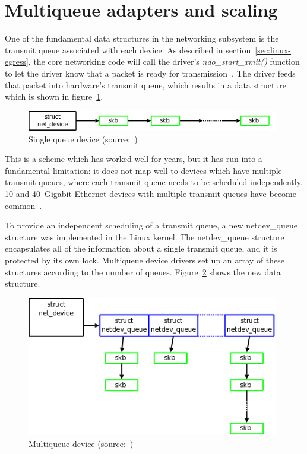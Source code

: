 
\section{Multiqueue adapters and scaling}\label{sec:linux-scaling}
One of the fundamental data structures in the networking subsystem is the transmit queue associated with each device.
As described in section~\ref{sec:linux-egress}, the core networking code will call the driver's {\it{ndo\_start\_xmit()}}
function to let the driver know that a packet is ready for transmission~\cite{mq-networking}.
The driver feeds that packet into hardware's transmit queue,
which results in a data structure which is shown in figure~\ref{fig:linux-queue-old}.
\begin{figure}
	\centering
	\includegraphics[width=11cm,keepaspectratio]{fig/net-queue-old.png}
	\caption{Single queue device (source:~\cite{mq-networking})}
	\label{fig:linux-queue-old}
\end{figure}

This is a scheme which has worked well for years, but it has run into a fundamental limitation:
it does not map well to devices which have multiple transmit queues,
where each transmit queue needs to be scheduled independently.
10 and 40~Gigabit Ethernet devices with multiple transmit queues have become common~\cite{mq-networking}.

To provide an independent scheduling of a transmit queue,
a new netdev\_queue structure was implemented in the Linux kernel.
The netdev\_queue structure encapsulates all of the information about a single transmit queue,
and it is protected by its own lock.
Multiqueue device drivers set up an array of these structures according to the number of queues.
Figure~\ref{fig:linux-queue-mq} shows the new data structure.
\begin{figure}
	\centering
	\includegraphics[width=11cm,keepaspectratio]{fig/net-queue-mq.png}
	\caption{Multiqueue device (source:~\cite{mq-networking})}
	\label{fig:linux-queue-mq}
\end{figure}

